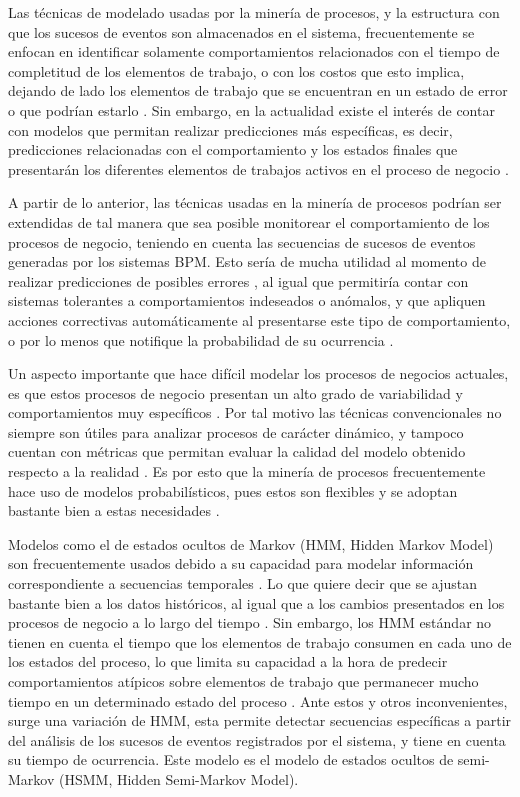 Las técnicas de modelado usadas por la minería de procesos, y la estructura con que los sucesos de eventos son almacenados en el sistema, frecuentemente se enfocan en identificar solamente comportamientos relacionados con el tiempo de completitud de los elementos de trabajo, o con los costos que esto implica, dejando de lado los elementos de trabajo que se encuentran en un estado de error o que podrían estarlo \cite{VanDerAalst2011}. Sin embargo, en la actualidad existe el interés de contar con modelos que permitan realizar predicciones más específicas, es decir, predicciones relacionadas con el comportamiento y los estados finales que presentarán los diferentes elementos de trabajos activos en el proceso de negocio \cite{Camara2015}. 

A partir de lo anterior, las técnicas usadas en la minería de procesos podrían ser extendidas de tal manera que sea posible monitorear el comportamiento de los procesos de negocio, teniendo en cuenta las secuencias de sucesos de eventos generadas por los sistemas BPM. Esto sería de mucha utilidad al momento de realizar predicciones de posibles errores \cite{Kang2014}, al igual que permitiría contar con sistemas tolerantes a comportamientos indeseados o anómalos, y que apliquen acciones correctivas automáticamente al presentarse este tipo de comportamiento, o por lo menos que notifique la probabilidad de su ocurrencia \cite{Salfner2007,Yu2006}.

Un aspecto importante que hace difícil modelar los procesos de negocios actuales, es que estos procesos de negocio presentan un alto grado de variabilidad y comportamientos muy específicos \cite{Ferreira2007}. Por tal motivo las técnicas convencionales no siempre son útiles para analizar procesos de carácter dinámico, y tampoco cuentan con métricas que permitan evaluar la calidad del modelo obtenido respecto a la realidad \cite{Rozinat2008}. Es por esto que la minería de procesos frecuentemente hace uso de modelos probabilísticos, pues estos son flexibles y se adoptan bastante bien a estas necesidades \cite{DaSilva2009}. 

Modelos como el de estados ocultos de Markov (HMM, Hidden Markov Model) son frecuentemente usados debido a su capacidad para modelar información correspondiente a secuencias temporales \cite{DaSilva2009}. Lo que quiere decir que se ajustan bastante bien a los datos históricos, al igual que a los cambios presentados en los procesos de negocio a lo largo del tiempo \cite{Rozinat2008}. Sin embargo, los HMM estándar no tienen en cuenta el tiempo que los elementos de trabajo consumen en cada uno de los estados del proceso, lo que limita su capacidad a la hora de predecir comportamientos atípicos sobre elementos de trabajo que permanecer mucho tiempo en un determinado estado del proceso \cite{DaSilva2009}. Ante estos y otros inconvenientes, surge una variación de HMM, esta permite detectar secuencias específicas a partir del análisis de los sucesos de eventos registrados por el sistema, y tiene en cuenta su tiempo de ocurrencia. Este modelo es el modelo de estados ocultos de semi-Markov (HSMM, Hidden Semi-Markov Model).

